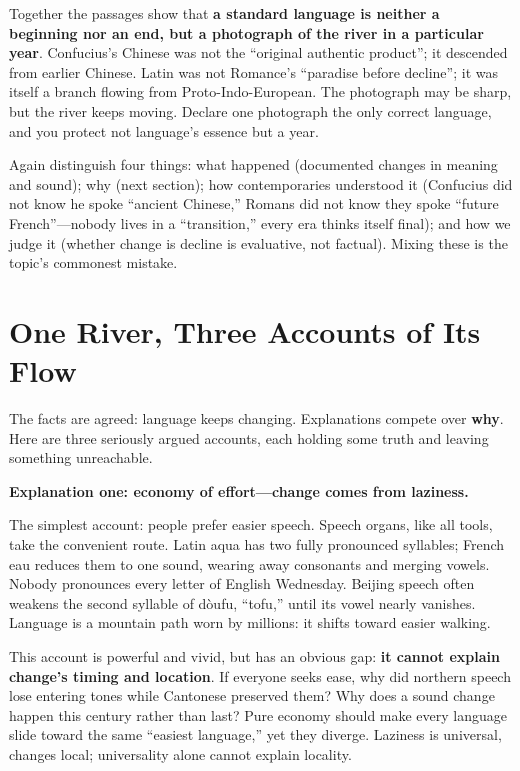 Together the passages show that \textbf{a standard language is neither a beginning nor an end, but a photograph of the river in a particular year}. Confucius's Chinese was not the ``original authentic product''; it descended from earlier Chinese. Latin was not Romance's ``paradise before decline''; it was itself a branch flowing from Proto-Indo-European. The photograph may be sharp, but the river keeps moving. Declare one photograph the only correct language, and you protect not language's essence but a year.

Again distinguish four things: what happened (documented changes in meaning and sound); why (next section); how contemporaries understood it (Confucius did not know he spoke ``ancient Chinese,'' Romans did not know they spoke ``future French''---nobody lives in a ``transition,'' every era thinks itself final); and how we judge it (whether change is decline is evaluative, not factual). Mixing these is the topic's commonest mistake.

\section{One River, Three Accounts of Its Flow}
The facts are agreed: language keeps changing. Explanations compete over \textbf{why}. Here are three seriously argued accounts, each holding some truth and leaving something unreachable.

\textbf{Explanation one: economy of effort---change comes from laziness.}

The simplest account: people prefer easier speech. Speech organs, like all tools, take the convenient route. Latin aqua has two fully pronounced syllables; French eau reduces them to one sound, wearing away consonants and merging vowels. Nobody pronounces every letter of English Wednesday. Beijing speech often weakens the second syllable of dòufu, ``tofu,'' until its vowel nearly vanishes. Language is a mountain path worn by millions: it shifts toward easier walking.

This account is powerful and vivid, but has an obvious gap: \textbf{it cannot explain change's timing and location}. If everyone seeks ease, why did northern speech lose entering tones while Cantonese preserved them? Why does a sound change happen this century rather than last? Pure economy should make every language slide toward the same ``easiest language,'' yet they diverge. Laziness is universal, changes local; universality alone cannot explain locality.

